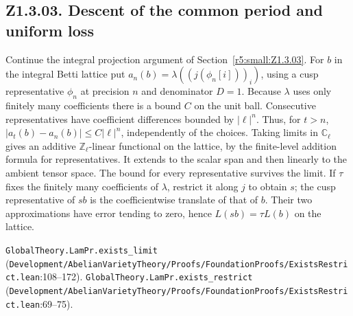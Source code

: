 \subsection{Z1.3.03. Descent of the common period and uniform loss}\label{r6:Z1.3.03}
Continue the integral projection argument of Section~\ref{r5:small:Z1.3.03}. For $b$ in the integral Betti lattice put $a_n(b)=\lambda((j(\phi_n[i]))_i)$, using a cusp representative $\phi_n$ at precision $n$ and denominator $D=1$. Because $\lambda$ uses only finitely many coefficients there is a bound $C$ on the unit ball. Consecutive representatives have coefficient differences bounded by $|\ell|^n$. Thus, for $t>n$, $|a_t(b)-a_n(b)|\le C|\ell|^n$, independently of the choices. Taking limits in $\mathbb C_\ell$ gives an additive $\mathbb Z_\ell$-linear functional on the lattice, by the finite-level addition formula for representatives. It extends to the scalar span and then linearly to the ambient tensor space. The bound for every representative survives the limit. If $\tau$ fixes the finitely many coefficients of $\lambda$, restrict it along $j$ to obtain $s$; the cusp representative of $sb$ is the coefficientwise translate of that of $b$. Their two approximations have error tending to zero, hence $L(sb)=\tau L(b)$ on the lattice.
\par{\footnotesize \nolinkurl{GlobalTheory.LamPr.exists_limit} (\nolinkurl{Development/AbelianVarietyTheory/Proofs/FoundationProofs/ExistsRestrict.lean}\allowbreak:108--172). \nolinkurl{GlobalTheory.LamPr.exists_restrict} (\nolinkurl{Development/AbelianVarietyTheory/Proofs/FoundationProofs/ExistsRestrict.lean}\allowbreak:69--75).\par}

